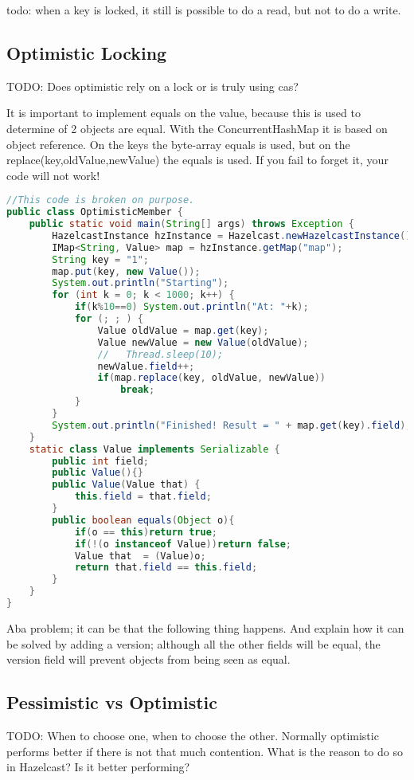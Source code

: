 todo: when a key is locked, it still is possible to do a read, but not to do a write.

\subsection{Optimistic Locking}
TODO: Does optimistic rely on a lock or is truly using cas?

It is important to implement equals on the value, because this is used to determine of 2 objects are equal. With the ConcurrentHashMap it is based on object reference. On the keys the byte-array equals is used, but on the replace(key,oldValue,newValue) the equals is used. If you fail to forget it, your code will not work!

\begin{lstlisting}[language=java]
//This code is broken on purpose.
public class OptimisticMember {
    public static void main(String[] args) throws Exception {
        HazelcastInstance hzInstance = Hazelcast.newHazelcastInstance();
        IMap<String, Value> map = hzInstance.getMap("map");
        String key = "1";
        map.put(key, new Value());
        System.out.println("Starting");
        for (int k = 0; k < 1000; k++) {
            if(k%10==0) System.out.println("At: "+k);
            for (; ; ) {
                Value oldValue = map.get(key);
                Value newValue = new Value(oldValue);
                //   Thread.sleep(10);
                newValue.field++;
                if(map.replace(key, oldValue, newValue))
                    break;
            }
        }
        System.out.println("Finished! Result = " + map.get(key).field);
    }
    static class Value implements Serializable {
        public int field;
        public Value(){}
        public Value(Value that) {
            this.field = that.field;
        }
        public boolean equals(Object o){
            if(o == this)return true;
            if(!(o instanceof Value))return false;
            Value that  = (Value)o;
            return that.field == this.field;
        }
    }
}
\end{lstlisting}
Aba problem; it can be that the following thing happens. And explain how it can be solved by adding a version; although all the other fields will be equal, the version field will prevent objects from being seen as equal.

\subsection{Pessimistic vs Optimistic}
TODO: When to choose one, when to choose the other. Normally optimistic performs better if there is not that much contention. What is the reason to do so in Hazelcast? Is it better performing?

